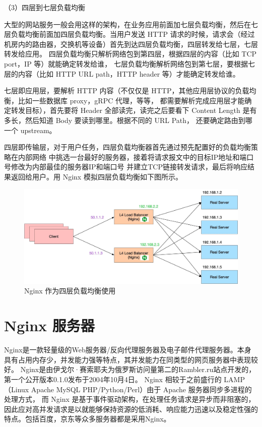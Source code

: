 （3）四层到七层负载均衡

大型的网站服务一般会用这样的架构，在业务应用前面加七层负载均衡，然后在七层负载均衡前面加四层负载均衡。当用户发送 HTTP 请求的时候，请求会（经过机房内的路由器，交换机等设备）首先到达四层负载均衡，四层转发给七层，七层转发给应用。
四层负载均衡只解析网络包到第四层，根据四层的内容（比如 TCP port，IP 等）就能确定转发给谁，
七层负载均衡解析网络包到第七层，要根据七层的内容（比如 HTTP URL path，HTTP header 等）才能确定转发给谁。

七层即应用层\cite{pak2015efficient}，要解析 HTTP 内容（不仅仅是 HTTP，其他应用层协议的负载均衡，比如一些数据库 proxy，gRPC 代理，等等，
都需要解析完成应用层才能确定转发目标），首先要将 Header 全部读完，读完之后要看下
Content Length 是有多长，然后知道 Body 要读到哪里。根据不同的 URL Path，
还要确定路由到哪一个 upstream。


四层即传输层，对于用户任务，四层负载均衡器首先通过预先配置好的负载均衡策略在内部网络
中挑选一台最好的服务器，接着将请求报文中的目标IP地址和端口号修改为内部最佳的服务器IP和端口号
并建立TCP链接转发请求，最后将响应结果返回给用户。用 Nginx 模拟四层负载均衡如下图所示。

\begin{figure}[htb]
  \centering
  \includegraphics[width=\textwidth]{figures/nginx-l4lb-2048x911.jpg}
  \caption{Nginx 作为四层负载均衡使用}
\end{figure}

\newpage

\section{Nginx 服务器}

Nginx是一款轻量级的Web服务器/反向代理服务器及电子邮件代理服务器。本身具有占用内存少，并发能力强等特点，其并发能力在同类型的网页服务器中表现较好。
Nginx是由伊戈尔·赛索耶夫为俄罗斯访问量第二的Rambler.ru站点开发的，第一个公开版本0.1.0发布于2004年10月4日。
Nginx 相较于之前盛行的 LAMP（Linux Apache MySQL PHP/Python/Perl）由于 Apache 服务器同步多进程的处理方式，
而 Nginx 是基于事件驱动架构，在处理任务请求是异步而非阻塞的，因此应对高并发请求是以就能够保持资源的低消耗、响应能力迅速以及稳定性强的特点\cite{凌质亿2013高并发环境下}。包括百度，京东等众多服务器都是采用Nginx。

